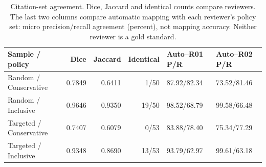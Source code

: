 \begin{table}[!tbp]\centering\scriptsize
\caption{Citation-set agreement. Dice, Jaccard and identical counts compare reviewers. The last two columns compare automatic mapping with each reviewer's policy set: micro precision/recall agreement (percent), not mapping accuracy. Neither reviewer is a gold standard.}\label{tab:reviewer-set-agreement}
\begin{tabular}{lrrrll}\toprule
Sample / policy & Dice & Jaccard & Identical & Auto--R01 P/R & Auto--R02 P/R \\ \midrule
Random / Conservative & 0.7849 & 0.6411 & 1/50 & 87.92/82.34 & 73.52/81.46 \\
Random / Inclusive & 0.9646 & 0.9350 & 19/50 & 98.52/68.79 & 99.58/66.48 \\
Targeted / Conservative & 0.7407 & 0.6079 & 0/53 & 83.88/78.40 & 75.34/77.29 \\
Targeted / Inclusive & 0.9348 & 0.8690 & 13/53 & 93.79/62.97 & 99.61/63.18 \\
\bottomrule\end{tabular}\end{table}
